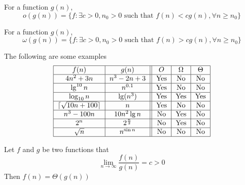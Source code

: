 					\begin{definition}[$o$-Notation]
						For a function $g(n)$, 
						\begin{equation*}
							o(g(n)) = \{f: \exists c > 0, n_0 > 0 \text{ such that } f(n) < cg(n), \forall n\ge n_0\}
						\end{equation*}					
					\end{definition}

					\begin{definition}
						For a function $g(n)$, 
						\begin{equation*}
							\omega(g(n)) = \{f: \exists c > 0, n_0 > 0 \text{ such that } f(n) > cg(n), \forall n\ge n_0\}
						\end{equation*}					
					\end{definition}


					\begin{example}
						The following are some examples
						\begin{align}
							\centering
							\begin{tabular}{|c|c||c|c|c|}
								\hline
								$f(n)$ & $g(n)$ & $O$ & $\Omega$ & $\Theta$\\
								\hline
								$4n^2 + 3n$ & $n^3 - 2n + 3$ & Yes & No & No \\
								\hline
								$\lg^{10} n$ & $n^{0.1}$ & Yes & No & No \\
								\hline
								$\log_{10} n$ & $\lg(n^3)$ & Yes & Yes & Yes \\
								\hline
								$\lceil \sqrt{10n + 100} \rceil$ & $n$ & Yes & No & No \\
								\hline
								$n^3 -100n$ & $10n^2\lg n$ & No & Yes & No\\
								\hline
								$2^n$ & $2^{\frac n2}$ & No & Yes & No \\
								\hline
								$\sqrt{n}$ & $n^{\sin n}$ & No & No & No\\
								\hline
							\end{tabular}
						\end{align}
					\end{example}

					\begin{theorem}
						Let $f$ and $g$ be two functions that
						\begin{equation*}
							\lim_{n\rightarrow \infty} \frac{f(n)}{g(n)} = c > 0
						\end{equation*}
						Then $f(n) = \Theta(g(n))$
					\end{theorem}

